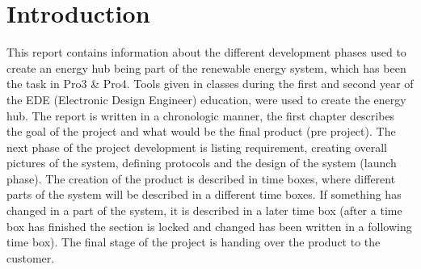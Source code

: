 
\chapter{Introduction}
This report contains information about the different development phases used to create an energy hub being part of the renewable energy system, which has been the task in Pro3 \& Pro4. Tools given in classes during the first and second year of the EDE (Electronic Design Engineer) education, were used to create the energy hub.\p
 \p The report is written in a chronologic manner, the first chapter describes the goal of the project and what would be the final product (pre project).
\p The next phase of the project development is listing requirement, creating overall pictures of the system, defining protocols and the design of the system (launch phase).
\p The creation of the product is described in time boxes, where different parts of the system will be described in a different time boxes. If something has changed in a part of the system, it is described in a later time box (after a time box has finished the section is locked and changed has been written in a following time box).
The final stage of the project is handing over the product to the customer.

\newpage

